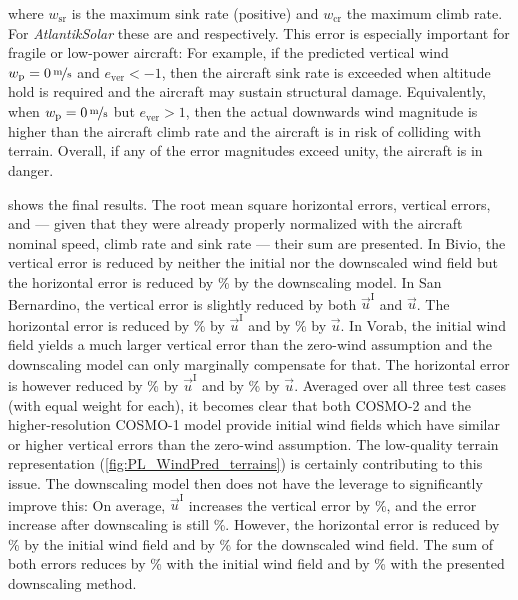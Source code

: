 \documentclass[twocolumn,letterpaper]{IEEEAerospaceCLS}
\begin{document}
where $w_\text{sr}$ is the maximum sink rate (positive) and $w_\text{cr}$ the maximum climb rate. For \emph{AtlantikSolar} these are  and  respectively. This error is especially important for fragile or low-power aircraft: For example, if the predicted vertical wind $w_\text{p}=\unitfrac[0]{m}{s}$ and $e_\text{ver}<-1$, then the aircraft sink rate is exceeded when altitude hold is required and the aircraft may sustain structural damage. Equivalently, when $w_\text{p}=\unitfrac[0]{m}{s}$ but $e_\text{ver}>1$, then the actual downwards wind magnitude is higher than the aircraft climb rate and the aircraft is in risk of colliding with terrain. Overall, if any of the error magnitudes exceed unity, the aircraft is in danger. 

 shows the final results. The root mean square horizontal errors, vertical errors, and --- given that they were already properly normalized with the aircraft nominal speed, climb rate and sink rate --- their sum are presented. In Bivio, the vertical error is reduced by neither the initial nor the downscaled wind field but the horizontal error is reduced by \unit[38]{\%} by the downscaling model. In San Bernardino, the vertical error is slightly reduced by both $\vec{u}^\text{I}$ and $\vec{u}$. The horizontal error is reduced by \unit[27]{\%} by $\vec{u}^\text{I}$ and by \unit[31]{\%} by $\vec{u}$. In Vorab, the initial wind field yields a much larger vertical error than the zero-wind assumption and the downscaling model can only marginally compensate for that. The horizontal error is however reduced by \unit[46]{\%} by $\vec{u}^\text{I}$ and by \unit[48]{\%} by $\vec{u}$. Averaged over all three test cases (with equal weight for each), it becomes clear that both COSMO-2 and the higher-resolution COSMO-1 model provide initial wind fields which have similar or higher vertical errors than the zero-wind assumption. The low-quality terrain representation (\cref{fig:PL_WindPred_terrains}) is certainly contributing to this issue. The downscaling model then does not have the leverage to significantly improve this: On average, $\vec{u}^\text{I}$ increases the vertical error by \unit[30]{\%}, and the error increase after downscaling is still \unit[26]{\%}. However, the horizontal error is reduced by \unit[31]{\%} by the initial wind field and by \unit[41]{\%} for the downscaled wind field. The sum of both errors reduces by \unit[15]{\%} with the initial wind field and by \unit[23]{\%} with the presented downscaling method.
\end{document}
